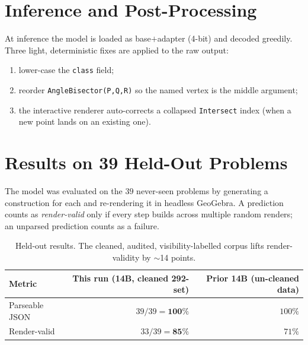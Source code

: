 \documentclass[11pt]{article}
\begin{document}
\section{Inference and Post-Processing}
At inference the model is loaded as base$+$adapter (4-bit) and decoded greedily.
Three light, deterministic fixes are applied to the raw output:
\begin{enumerate}[noitemsep,topsep=2pt]
  \item lower-case the \texttt{class} field;
  \item reorder \texttt{AngleBisector(P,Q,R)} so the named vertex is the middle
  argument;
  \item the interactive renderer auto-corrects a collapsed \texttt{Intersect}
  index (when a new point lands on an existing one).
\end{enumerate}

\section{Results on 39 Held-Out Problems}
\label{sec:results}
The model was evaluated on the $39$ never-seen problems by generating a
construction for each and re-rendering it in headless GeoGebra. A prediction
counts as \emph{render-valid} only if every step builds across multiple random
renders; an unparsed prediction counts as a failure.

\begin{table}[h]
\centering
\begin{tabular}{lrr}
\toprule
Metric & This run (14B, cleaned 292-set) & Prior 14B (un-cleaned data) \\
\midrule
Parseable JSON & $39/39 = \mathbf{100\%}$ & $100\%$ \\
Render-valid   & $33/39 = \mathbf{85\%}$  & $71\%$ \\
\bottomrule
\end{tabular}
\caption{Held-out results. The cleaned, audited, visibility-labelled corpus
lifts render-validity by $\sim$14 points.}
\end{table}
\end{document}
